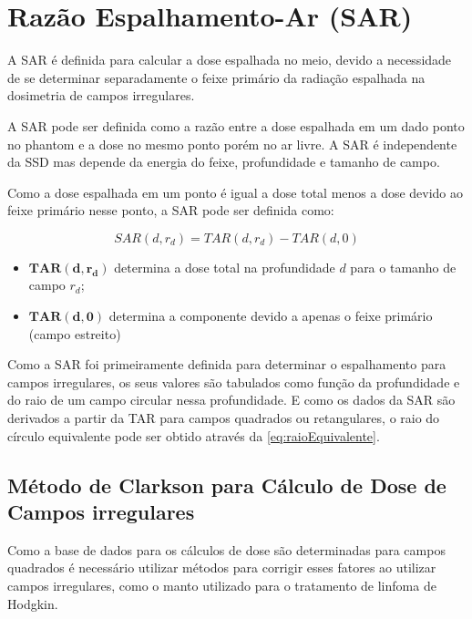 \documentclass[11pt,a4paper]{article}
\newcounter{exemplo}
\begin{document}
	\section{Razão Espalhamento-Ar (SAR)}

	A SAR é definida para calcular a dose espalhada no meio, devido a necessidade de se determinar separadamente o feixe primário da radiação espalhada na dosimetria de campos irregulares.

	A SAR pode ser definida como a razão entre a dose espalhada em um dado ponto no phantom e a dose no mesmo ponto porém no ar livre. A SAR é independente da SSD mas depende da energia do feixe, profundidade e tamanho de campo. 

	Como a dose espalhada em um ponto é igual a dose total menos a dose devido ao feixe primário nesse ponto, a SAR pode ser definida como:

		\begin{equation}
			SAR(d,r_d) = TAR(d,r_d) - TAR(d, 0)
		\end{equation}

		\begin{exemplo}[onde:]
			\begin{itemize}
				\item \textcolor{CarnationPink}{$\mathbf{TAR(d,r_d)}$} determina a dose total na profundidade $d$ para o tamanho de campo $r_d$; 
				\item \textcolor{CarnationPink}{$\mathbf{TAR(d, 0)}$} determina a componente devido a apenas o feixe primário (campo estreito)
			\end{itemize}
		\end{exemplo}

	Como a SAR foi primeiramente definida para determinar o espalhamento para campos irregulares, os seus valores são tabulados como função da profundidade e do raio de um campo circular nessa profundidade. E como os dados da SAR são derivados a partir da TAR para campos quadrados ou retangulares, o raio do círculo equivalente pode ser obtido através da \ref{eq:raioEquivalente}.

	\subsection*{Método de Clarkson para Cálculo de Dose de Campos irregulares}
	
	Como a base de dados para os cálculos de dose são determinadas para campos quadrados é necessário utilizar métodos para corrigir esses fatores ao utilizar campos irregulares, como o manto utilizado para o tratamento de linfoma de Hodgkin. 
\end{document}
